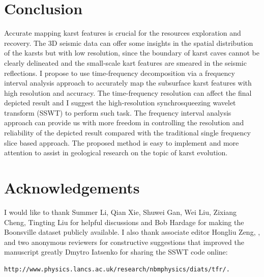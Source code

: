  
\section{Conclusion}
Accurate mapping  karst features is crucial for the resources exploration and recovery. The 3D seismic data can offer some insights in the spatial distribution of the karsts\new{,} but with low resolution, since the boundary of karst caves cannot be clearly delineated and the small-scale kart features are smeared in the seismic reflections. I propose to use time-frequency decomposition via a frequency interval analysis approach to accurately map the subsurface karst features with high resolution and accuracy. The time-frequency resolution can affect the final depicted result\new{,} and I suggest  the high-resolution synchrosqueezing wavelet transform (SSWT) to perform such task. The frequency interval analysis approach can provide us with more freedom in controlling the resolution and reliability of the  depicted result\new{,} compared with the traditional single frequency slice based approach. The proposed method is easy to implement and  more attention to assist in geological research on the topic of karst evolution.


\section{Acknowledgements}
I would like to thank Summer Li, Qian Xie, Shuwei Gan, Wei Liu, Zixiang Cheng, Tingting Liu for helpful discussions\new{,} and Bob Hardage for making the Boonsville dataset publicly available.  I also thank associate editor Hongliu Zeng, , and two anonymous reviewers for constructive suggestions that improved the manuscript greatly Dmytro Iatsenko for sharing the SSWT code online: 
\begin{verbatim}
http://www.physics.lancs.ac.uk/research/nbmphysics/diats/tfr/.
\end{verbatim}
\newpage

\listoffigures










